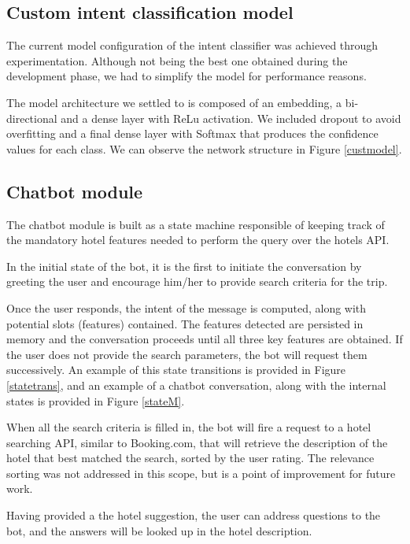 \documentclass[runningheads,a4paper,11pt]{report}
\begin{document}
\subsection{Custom intent classification model}
\label{section:customModels}

The current model configuration of the intent classifier was achieved through experimentation. Although not being the best one obtained during the development phase, we had to simplify the model for performance reasons. 

The model architecture we settled to is composed of an embedding, a bi-directional and a dense layer with ReLu activation. We included dropout to avoid overfitting and a final dense layer with Softmax that produces the confidence values for each class. We can observe the network structure in Figure \ref{custmodel}.


\subsection{Chatbot module}
\label{section:chatbot}

The chatbot module is built as a state machine responsible of keeping track of the mandatory hotel features needed to perform the query over the hotels API. 

In the initial state of the bot, it is the first to initiate the conversation by greeting the user and encourage him/her to provide search criteria for the trip. 

Once the user responds, the intent of the message is computed, along with potential slots (features) contained. 
The features detected are persisted in memory and the conversation proceeds until all three key features are obtained. If the user does not provide the search parameters, the bot will request them successively. An example of this state transitions is provided in Figure \ref{statetrans}, and an example of a chatbot conversation, along with the internal states is provided in Figure \ref{stateM}.

When all the search criteria is filled in, the bot will fire a request to a hotel searching API, similar to Booking.com, that will retrieve the description of the hotel that best matched the search, sorted by the user rating. The relevance sorting was not addressed in this scope, but is a point of improvement for future work.

Having provided a the hotel suggestion, the user can address questions to the bot, and the answers will be looked up in the hotel description.
\end{document}
